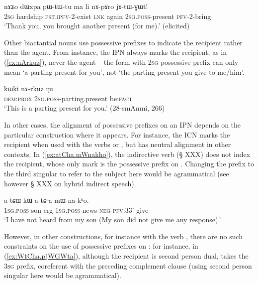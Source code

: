 \begin{exe}
\ex \label{ex:nApAro}
\gll nɤʑo dɯxpa pɯ-tɯ-tu ma li nɤ-pɤro jɤ-tɯ-ɣɯt! \\
\textsc{2sg} hardship \textsc{pst}.\textsc{ipfv}-2-exist \textsc{lnk} again \textsc{2sg}.\textsc{poss}-present \textsc{pfv}-2-bring \\
\glt `Thank you, you brought another present (for me).' (elicited)
\end{exe}

Other biactantial nouns use possessive prefixes to indicate the recipient rather than the agent. From instance, the IPN  always marks the recipient, as in (\ref{ex:nArkuz}), never the agent -- the form  with \textsc{2sg} possessive prefix can only mean `a parting present for you', not `the parting present you give to me/him'.

\begin{exe}
\ex \label{ex:nArkuz}
\gll  kɯki nɤ-rkuz ŋu \\
\textsc{dem}:\textsc{prox} \textsc{2sg}.\textsc{poss}-parting.present be:\textsc{fact} \\
\glt `This is a parting present for you.' (28-smAnmi, 266)
\end{exe}

In other cases, the alignment of possessive prefixes on an IPN depends on the  particular construction where it appears. For instance, the ICN  marks the recipient when used with the verbs  or , but has neutral alignment in other contexts. In (\ref{ex:atCha.mWnakho}), the indirective verb  (§ XXX) does not index the recipient, whose only mark is the possessive prefix on . Changing the prefix to the third singular  to refer to the subject here would be agrammatical (see however § XXX on hybrid indirect speech).


\begin{exe}
\ex \label{ex:atCha.mWnakho}
\gll  a-tɕɯ kɯ a-tɕʰa mɯ-na-kʰo. \\
\textsc{1sg}.\textsc{poss}-son erg \textsc{1sg}.\textsc{poss}-news \textsc{neg}-\textsc{pfv}:3\fl{}3'-give \\
\glt `I have not heard from my son (My son did not give me any response).' 
\end{exe}

However, in other constructions, for instance with the verb , there are no such constraints on the use of possessive prefixes on : for instance, in (\ref{ex:WtCha.pjWGWta}), although the recipient is second person dual,  takes the \textsc{3sg} prefix, coreferent with the preceding complement clause (using second person singular  here would be agrammatical).

